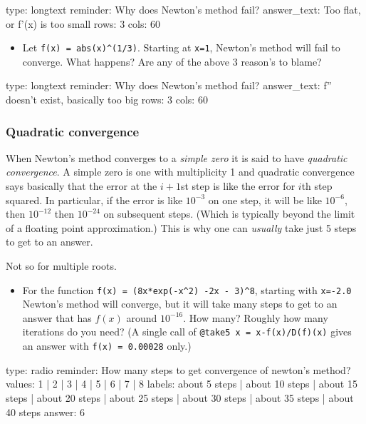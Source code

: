 \documentclass[12pt]{article}
\begin{document}
\begin{answer}
type: longtext
reminder: Why does Newton's method fail?
answer_text: Too flat, or f'(x) is too small 
rows: 3
cols: 60
\end{answer}

\begin{itemize}
\itemsep1pt\parskip0pt
\item
  Let \texttt{f(x) = abs(x)\^{}(1/3)}. Starting at \texttt{x=1},
  Newton's method will fail to converge. What happens? Are any of the
  above 3 reason's to blame?
\end{itemize}

\begin{answer}
type: longtext
reminder: Why does Newton's method fail?
answer_text: f'' doesn't exist, basically too big 
rows: 3
cols: 60
\end{answer}

\subsubsection{Quadratic convergence}

When Newton's method converges to a \emph{simple zero} it is said to
have \emph{quadratic convergence}. A simple zero is one with
multiplicity 1 and quadratic convergence says basically that the error
at the $i+1$st step is like the error for $i$th step squared. In
particular, if the error is like $10^{-3}$ on one step, it will be like
$10^{-6}$, then $10^{-12}$ then $10^{-24}$ on subsequent steps. (Which
is typically beyond the limit of a floating point approximation.) This
is why one can \emph{usually} take just 5 steps to get to an answer.

Not so for multiple roots.

\begin{itemize}
\itemsep1pt\parskip0pt
\item
  For the function \texttt{f(x) = (8x*exp(-x\^{}2) -2x - 3)\^{}8},
  starting with \texttt{x=-2.0} Newton's method will converge, but it
  will take many steps to get to an answer that has $f(x)$ around
  $10^{-16}$. How many? Roughly how many iterations do you need? (A
  single call of \texttt{@take5 x = x-f(x)/D(f)(x)} gives an answer with
  \texttt{f(x) = 0.00028} only.)
\end{itemize}

\begin{answer}
type: radio
reminder: How many steps to get convergence of newton's method?
values: 1 | 2 | 3 | 4 | 5 | 6 | 7 | 8
labels: about 5 steps | about 10 steps | about 15 steps | about 20 steps | about 25 steps | about 30 steps | about 35 steps | about 40 steps
answer: 6
\end{answer}
\end{document}
